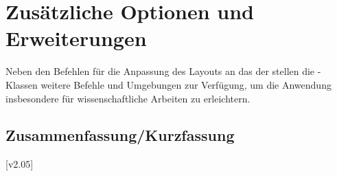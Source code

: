 \section{Zusätzliche Optionen und Erweiterungen}
%
Neben den Befehlen für die Anpassung des Layouts an das \CD der \TnUD stellen 
die \TUDScript-Klassen weitere Befehle und Umgebungen zur Verfügung, um die 
Anwendung insbesondere für wissenschaftliche Arbeiten zu erleichtern.


\subsection{Zusammenfassung/Kurzfassung}
[v2.05]
